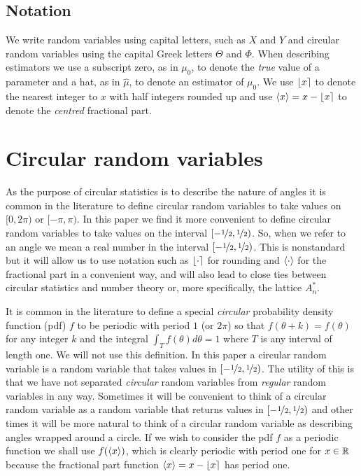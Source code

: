 \documentclass[journal]{IEEEtran}
\begin{document}
\subsection{Notation}
We write random variables using capital letters, such as $X$ and $Y$ and circular random variables using the capital Greek letters $\Theta$ and $\Phi$.  When describing estimators we use a subscript zero, as in $\mu_0$, to denote the \emph{true} value of a parameter and a hat, as in $\hat{\mu}$, to denote an estimator of $\mu_0$.  We use ${\left\lfloor x \right\rceil}$ to denote the nearest integer to $x$ with half integers rounded up and use $\left< x \right> = x - {\left\lfloor x \right\rceil}$ to denote the \emph{centred} fractional part.


\section{Circular random variables}\label{sec:circ-rand-vari}

As the purpose of circular statistics is to describe the nature of angles it is common in the literature to define circular random variables to take values on $[0, 2\pi)$ or $[-\pi, \pi)$. In this paper we find it more convenient to define circular random variables to take values on the interval $[-\nicefrac{1}{2}, \nicefrac{1}{2})$. So, when we refer to an angle we mean a real number in the interval $[-\nicefrac{1}{2}, \nicefrac{1}{2})$. This is nonstandard but it will allow us to use notation such as ${\left\lfloor \cdot \right\rceil}$ for rounding and $\left< \cdot \right>$ for the fractional part in a convenient way, and will also lead to close ties between circular statistics and number theory or, more specifically, the lattice $A_n^*$. 

It is common in the literature to define a special \emph{circular} probability density function (pdf) $f$ to be periodic with period $1$ (or $2\pi$) so that $f(\theta + k) = f(\theta)$ for any integer $k$ and the integral $\int_{T}f(\theta)d\theta = 1$ where $T$ is any interval of length one.  We will not use this definition.  In this paper a circular random variable is a random variable that takes values in $[-\nicefrac{1}{2},\nicefrac{1}{2})$. The utility of this is that we have not separated \emph{circular} random variables from \emph{regular} random variables in any way. Sometimes it will be convenient to think of a circular random variable as a random variable that returns values in $[-\nicefrac{1}{2},\nicefrac{1}{2})$ and other times it will be more natural to think of a circular random variable as describing angles wrapped around a circle.  %
If we wish to consider the pdf $f$ as a periodic function we shall use $f(\left< x \right>)$, which is clearly periodic with period one for $x \in {\mathbb R}$ because the fractional part function $\left< x \right> = x - {\left\lfloor x \right\rceil}$ has period one.
\end{document}
